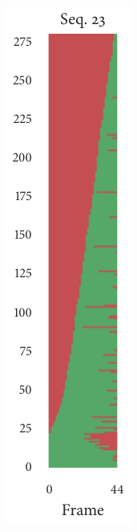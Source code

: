 \begin{figure}[b]
\begin{subfigure}[b]{0.2\textwidth}
		\centering
		\includegraphics{missingness_sequence23.pdf}
	\end{subfigure}%
	\begin{subfigure}[b]{0.2\textwidth}
		\centering

\end{subfigure}
\end{figure}
